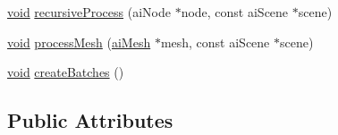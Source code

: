\begin{DoxyCompactItemize}
\item 
\hyperlink{_s_d_l__opengl_8h_a3db05964a3cc4410f35b7ea2b7eb850d}{void} \hyperlink{classassimp_mesh_a36b884bb029d5a2b8fdb71462cbcfb78}{recursive\-Process} (ai\-Node $\ast$node, const ai\-Scene $\ast$scene)
\item 
\hyperlink{_s_d_l__opengl_8h_a3db05964a3cc4410f35b7ea2b7eb850d}{void} \hyperlink{classassimp_mesh_a031d2bee1d447a845afca213b4172f8c}{process\-Mesh} (\hyperlink{structai_mesh}{ai\-Mesh} $\ast$mesh, const ai\-Scene $\ast$scene)
\item 
\hyperlink{_s_d_l__opengl_8h_a3db05964a3cc4410f35b7ea2b7eb850d}{void} \hyperlink{classassimp_mesh_afb0cdc86e349421e12d3e5efff466725}{create\-Batches} ()
\end{DoxyCompactItemize}
\subsection*{Public Attributes}
